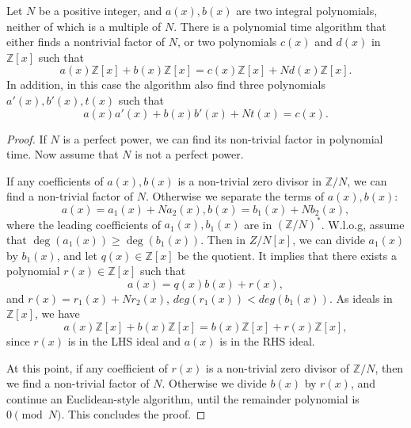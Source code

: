 \documentclass[10pt,a4paper]{amsart}
\newcommand{\Z}{{\mathbb Z}}
\begin{document}
\begin{lemma}\label{lem:polygcd} 
  Let \( N \) be a positive integer, %
  and \( a(x), b(x) \) are two integral polynomials,
  neither of which is a multiple of \( N \).
  There is a polynomial time algorithm that either finds
  a nontrivial factor of \( N \), or two polynomials
  \( c(x) \) and \( d(x ) \) in \( \Z[x] \)  such that
  \[ a(x)\Z[x] + b(x)\Z[x] = c(x)\Z[x] + N d(x)\Z[x].  \]
  In addition, in this case the algorithm also find three polynomials
  \( a'(x), b'(x), t(x) \)  such that
  \[ a(x) a'(x) + b(x) b'(x) + N t(x) = c(x).  \]
\end{lemma}

\begin{proof}
  If \( N \) is a perfect power, we can find its non-trivial factor
  in polynomial time. Now assume that \( N \) is not a perfect power.

  If any coefficients of \( a(x), b(x) \) is a
  non-trivial zero divisor in \( \Z/N \), we can find
  a non-trivial factor of \( N \).
  Otherwise we separate the terms of \( a(x), b(x) \):
  \[ a(x)=a_1 (x) + N a_2(x), b(x) = b_1(x) + N b_2(x),  \]
  where the leading coefficients of \( a_1(x), b_1(x) \)
  are in \( ( \Z/N )^* \). W.l.o.g, assume that
  \( \deg(a_1(x)) \geq \deg (b_1(x)). \)
  Then in \( Z/N[x] \), we can divide \( a_1(x) \)
  by \( b_1(x) \), and let \( q(x) \in \Z[x] \) be the quotient.
  It implies that there exists a polynomial \( r(x) \in \Z[x] \)
  such that 
\[ a(x) = q(x) b(x) + r(x), \]
and \( r(x) = r_1(x) + N r_2(x)\),
\( deg(r_1 (x)) < deg(b_1 (x)) \).
As ideals in \( \Z[x] \), we have
\[ a(x) \Z[x] + b(x) \Z[x] = b(x) \Z[x] + r(x) \Z [x],  \]
since \( r(x) \) is in the LHS ideal
and \( a(x) \) is in the RHS ideal.

At this point, if any coefficient of \( r(x) \)
is a non-trivial zero divisor of \( \Z/N \),
then we find a non-trivial factor of \( N \).
Otherwise we divide \( b(x) \) by \( r(x) \),
and continue an Euclidean-style algorithm,
until the remainder polynomial is \( 0 \pmod{N} \).
This concludes the proof.
\end{proof}
\end{document}
